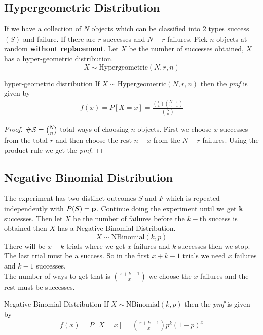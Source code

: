 \documentclass[16pt,a4paper]{article}
\begin{document}
\subsection{Hypergeometric Distribution}
If we have a collection of $N$ objects which can be classified into 2 types success $(S)$ and failure. If there are $r$ successes and $N-r$ failures. Pick $n$ objects at random \textbf{without replacement}. Let $X$ be the number of successes obtained, $X$ has a hyper-geometric distribution. 
\\
\[
X \sim \text{Hypergeometric}(N,r,n)
\]  
\begin{thm}{hyper-geometric distribution}
If $X \sim \text{Hypergeometric}(N,r,n)$ then the \textit{pmf} is given by 
\begin{align*}
f(x) = P[X=x] = \frac{{r\choose x}{N-r\choose n-x}}{{N\choose n}}
\end{align*}
\begin{proof}
$\# {\cal S} = {N \choose n}$ total ways of choosing $n$ objects. First we choose $x$ successes from the total $r$ and then choose the rest $n-x$ from the $N-r$ failures. Using the product rule we get the \textit{pmf}. 
\end{proof}
\end{thm}
\newpage
\subsection{Negative Binomial Distribution}
The experiment has two distinct outcomes $S$ and $F$ which is repeated independently with $P(S) = {\bf p}$. Continue doing the experiment until we get ${\bf k}$ successes. Then let $X$ be the number of failures before the $k-$th success is obtained then $X$ has a Negative Binomial Distribution. 
\[
X\sim \text{NBinomial}(k,p)
\]  
There will be $x+k$ trials where we get $x$ failures and $k$ successes then we stop. The last trial must be a success. So in the first $x+k-1$ trials we need $x$ failures and $k-1$ successes. 
\\
The number of ways to get that is ${x+k-1\choose x}$ we choose the $x$ failures and the rest must be successes. 

\begin{thm}{Negative Binomial Distribution}
If $X\sim \text{NBinomial}(k,p)$ then the \textit{pmf} is given by 
\begin{align*}
f(x)  = P[X=x]  = {x+k-1\choose x}p^k(1-p)^x
\end{align*}
\end{thm}
\end{document}
